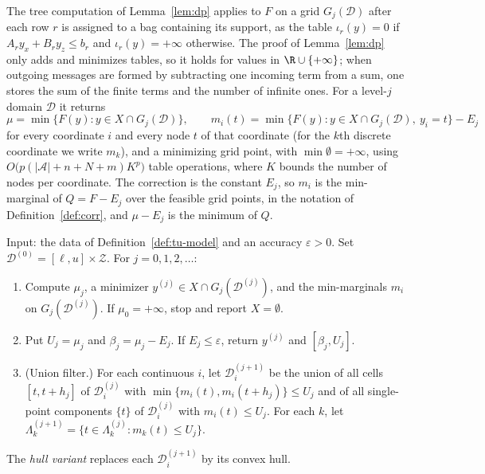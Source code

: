 The tree computation of Lemma~\ref{lem:dp} applies to $F$ on a grid
$G_j(\mathcal D)$ after each row $r$ is assigned to a bag containing its
support, as the table $\iota_r(y)=0$ if $A_ry_x+B_ry_z\le b_r$ and
$\iota_r(y)=+\infty$ otherwise. The proof of Lemma~\ref{lem:dp} only adds and
minimizes tables, so it holds for values in $\R\cup\{+\infty\}$; when outgoing
messages are formed by subtracting one incoming term from a sum, one stores
the sum of the finite terms and the number of infinite ones. For a level-$j$
domain $\mathcal D$ it returns
\[
\mu=\min\{F(y):y\in X\cap G_j(\mathcal D)\},\qquad
m_i(t)=\min\{F(y):y\in X\cap G_j(\mathcal D),\ y_i=t\}-E_j
\]
for every coordinate $i$ and every node $t$ of that coordinate (for the $k$th
discrete coordinate we write $m_k$), and a minimizing grid point, with $\min\emptyset=+\infty$, using
$O\bigl(p(\lvert\mathcal A\rvert+n+N+m)K^p\bigr)$ table operations, where $K$
bounds the number of nodes per coordinate. The correction is the constant
$E_j$, so $m_i$ is the min-marginal of $Q=F-E_j$ over the feasible grid
points, in the notation of Definition~\ref{def:corr}, and $\mu-E_j$ is the
minimum of $Q$.

\begin{algorithm}\label{alg:tugrid}
Input: the data of Definition~\ref{def:tu-model} and an accuracy
$\varepsilon>0$. Set $\mathcal D^{(0)}=[\ell,u]\times\mathcal Z$. For
$j=0,1,2,\dots$:
\begin{enumerate}[label=(\arabic*)]
\item Compute $\mu_j$, a minimizer $y^{(j)}\in X\cap G_j(\mathcal D^{(j)})$, and
the min-marginals $m_i$ on $G_j(\mathcal D^{(j)})$. If $\mu_0=+\infty$, stop and
report $X=\emptyset$.
\item Put $U_j=\mu_j$ and $\beta_j=\mu_j-E_j$. If $E_j\le\varepsilon$, return
$y^{(j)}$ and $[\beta_j,U_j]$.
\item (Union filter.) For each continuous $i$, let $\mathcal D^{(j+1)}_i$ be
the union of all cells $[t,t+h_j]$ of $\mathcal D^{(j)}_i$ with
$\min\{m_i(t),m_i(t+h_j)\}\le U_j$ and of all single-point components
$\{t\}$ of $\mathcal D^{(j)}_i$ with $m_i(t)\le U_j$. For each $k$, let
$\Lambda^{(j+1)}_k=\{t\in\Lambda^{(j)}_k:m_{k}(t)\le U_j\}$.
\end{enumerate}
The \emph{hull variant} replaces each $\mathcal D^{(j+1)}_i$ by its convex hull.
\end{algorithm}

